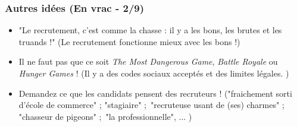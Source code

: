 \documentclass[slidetop,11pt]{beamer}
\begin{document}
\begin{frame}
\end{frame}

\begin{frame}
	\frametitle{Autres id{\'e}es (En vrac - 2/9)}
	\begin{itemize}
		\item "Le recrutement, c'est comme la chasse : il y a les bons, les brutes et les truands !" (Le recrutement fonctionne mieux avec les bons !)
		\item Il ne faut pas que ce soit \emph{The Most Dangerous Game}, \emph{Battle Royale} ou \emph{Hunger Games} ! (Il y a des codes sociaux accept{\'e}s et des limites l{\'e}gales. )
		\item Demandez ce que les candidats pensent des recruteurs ! ("fraichement sorti d'{\'e}cole de commerce" ; "stagiaire" ;~\newline "recruteuse usant de (ses) charmes" ; "chasseur de pigeons" ;~\newline "la professionnelle", ... )
	\end{itemize}
\end{frame}
\end{document}
